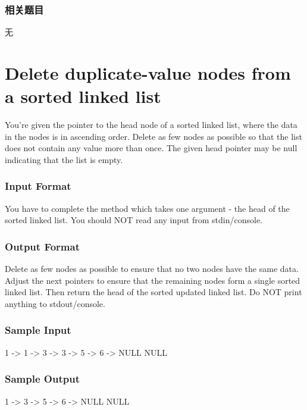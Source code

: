 \subsubsection{相关题目}
\begindot
\item 无
\myenddot


\section{Delete duplicate-value nodes from a sorted linked list} %
\label{sec:Delete-duplicate-value-nodes-from-a-sorted-linked-list}

You’re given the pointer to the head node of a sorted linked list, where the data in the nodes is in ascending order. Delete as few nodes as possible so that the list does not contain any value more than once. The given head pointer may be null indicating that the list is empty.


\subsubsection{Input Format}
You have to complete the  method which takes one argument - the head of the sorted linked list. You should NOT read any input from stdin/console.


\subsubsection{Output Format}
Delete as few nodes as possible to ensure that no two nodes have the same data. Adjust the next pointers to ensure that the remaining nodes form a single sorted linked list. Then return the head of the sorted updated linked list. Do NOT print anything to stdout/console.


\subsubsection{Sample Input}
\begin{Code}
1 -> 1 -> 3 -> 3 -> 5 -> 6 -> NULL
NULL
\end{Code}


\subsubsection{Sample Output}
\begin{Code}
1 -> 3 -> 5 -> 6 -> NULL
NULL
\end{Code}



